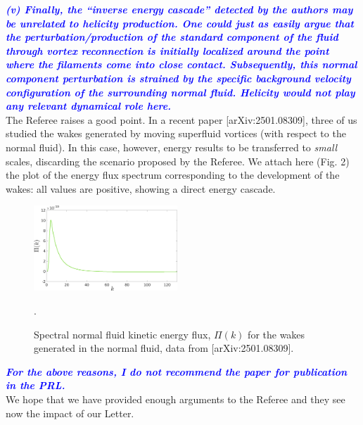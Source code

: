 \documentclass[a4paper,10pt]{article}
\def\blue#1{\textcolor{blue}{#1}}
\def\refcomment#1{\textbf{\blue{\emph{#1}}}\\}
\begin{document}
\refcomment{(v) Finally, the “inverse energy cascade” detected by the authors may be unrelated to helicity production. One could just as easily argue that the perturbation/production of the standard component of the fluid through vortex reconnection is initially localized around the point where the filaments come into close contact. Subsequently, this normal component perturbation is strained by the specific background velocity configuration of the surrounding normal fluid. Helicity would not play any relevant dynamical role here.}

The Referee raises a good point. In a recent paper [arXiv:2501.08309], three of us studied the wakes generated by moving superfluid vortices (with respect to the normal fluid). In this case, however, energy results to be transferred to \textit{small} scales, discarding the scenario proposed by the Referee. We attach here (Fig. 2) the plot of the energy flux spectrum corresponding to the development of the wakes: all values are positive, showing a direct energy cascade. \\



%
\begin{figure}[h!]
    \centering
    \includegraphics*[width=0.48\textwidth]{flux_wakes.png}
    \caption{Spectral normal fluid kinetic energy flux, $\Pi (k)$ for the wakes generated in the normal fluid, data from [arXiv:2501.08309].}.
    
\end{figure}

\refcomment{For the above reasons, I do not recommend the paper for publication in the PRL.}

\noindent We hope that we have provided enough arguments to the Referee and they see now the impact of our Letter.
\end{document}
